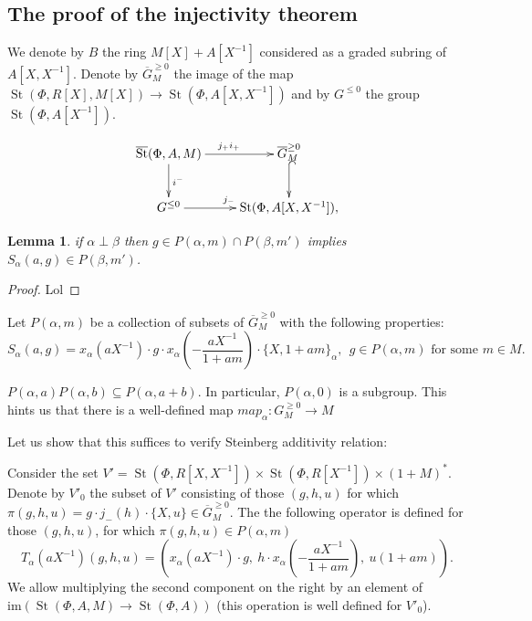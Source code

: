 \documentclass[oneside, 8pt]{amsart}
\newtheorem{lemma}{Lemma}
\theoremstyle{remark}
\theoremstyle{definition}
\DeclareMathOperator{\St}{St}
\numberwithin{equation}{section}
\begin{document}
  
\subsection{The proof of the injectivity theorem}
We denote by $B$ the ring $M[X] + A[X^{-1}]$ considered as a graded subring of $A[X, X^{-1}]$.
Denote by $\overline{G}^{\geq 0}_M$ the image of the map $\St(\Phi, R[X], M[X]) \to \St(\Phi, A[X, X^{-1}])$ and by
 $G^{\leq 0}$ the group $\St(\Phi, A[X^{-1}])$.

\[ \xymatrix{ \overline{\St}(\Phi, A, M) \ar[r]^{j_+i_+} \ar[d]^{i^-} & \overline{G}_M^{\geq 0} \ar@{^{(}->}[d] \\
              G^{\leq 0} \ar[r]^{j_-} & \St(\Phi, A[X, X^{-1}]), } \] 

\begin{lemma} if $\alpha \perp \beta$ then $g \in P(\alpha, m) \cap P(\beta, m')$ implies $S_\alpha(a, g) \in P(\beta, m')$. \end{lemma}
\begin{proof}
 Lol
\end{proof}

Let $P(\alpha, m)$ be a collection of subsets of $\overline{G}^{\geq 0}_M$ with the following properties:
\[ S_\alpha(a, g) = x_\alpha(aX^{-1})\cdot g \cdot x_\alpha\left(-\frac{aX^{-1}}{1 + am}\right) \cdot \{X, 1+ am\}_\alpha,\ \ g \in P(\alpha, m)\text{ for some $m \in M$}.\]

$P(\alpha, a) P(\alpha, b) \subseteq P(\alpha, a + b)$.
In particular, $P(\alpha, 0)$ is a subgroup.
This hints us that there is a well-defined map $map_\alpha \colon G_M^{\geq 0} \to M$

Let us show that this suffices to verify Steinberg additivity relation:

Consider the set $V' = \St(\Phi, R[X, X^{-1}]) \times \St(\Phi, R[X^{-1}]) \times (1 + M)^*$.
Denote by $V'_0$ the subset of $V'$ consisting of those $(g, h, u)$ for which $\pi(g, h, u) = g \cdot j_-(h) \cdot \{ X, u \} \in \overline{G}_M^{\geq 0}$.
The the following operator is defined for those $(g, h, u)$, for which $\pi(g, h, u) \in P(\alpha, m)$
\[ T_\alpha(aX^{-1})(g, h, u) = \left( x_\alpha(aX^{-1})\cdot g ,\
                                         h \cdot x_\alpha\left(-\frac{aX^{-1}}{1 + am}\right),\ 
                                         u(1 + am)\right).\]
We allow multiplying the second component on the right by an element of $\mathrm{im}(\St(\Phi, A, M) \to \St(\Phi, A))$
 (this operation is well defined for $V'_0$).
\end{document}
